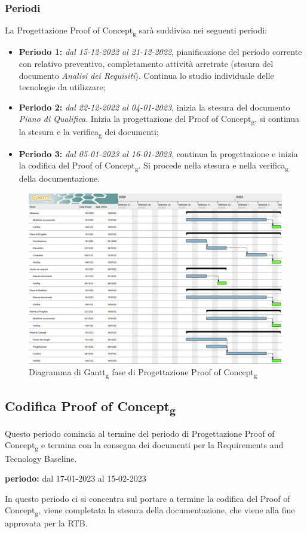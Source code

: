 \subsubsection{Periodi}
La Progettazione Proof of Concept\textsubscript{g} sarà suddivisa nei seguenti periodi:
\begin{itemize}
\item \textbf{Periodo 1:} \textit{dal 15-12-2022 al 21-12-2022}, pianificazione del periodo corrente con relativo preventivo, completamento attività arretrate 
(stesura del documento \textit{Analisi dei Requisiti}). Continua lo studio individuale delle tecnologie da utilizzare;
\item \textbf{Periodo 2:} \textit{dal 22-12-2022 al 04-01-2023}, inizia la stesura del documento \textit{Piano di Qualifica}. Inizia la progettazione del Proof of Concept\textsubscript{g}, si continua la stesura e la verifica\textsubscript{g} dei documenti;
\item \textbf{Periodo 3:} \textit{dal 05-01-2023 al 16-01-2023}, continua la progettazione e inizia la codifica del Proof of Concept\textsubscript{g}. Si procede nella stesura e nella verifica\textsubscript{g} della documentazione.
\end{itemize}

\begin{figure}[H]
    \centering
    \includegraphics[scale=0.72]{image/gantt_poc.png}
    \caption{Diagramma di Gantt\textsubscript{g} fase di Progettazione Proof of Concept\textsubscript{g}}
\end{figure}
\pagebreak

\subsection{Codifica Proof of Concept\textsubscript{g}}
Questo periodo comincia al termine del periodo di Progettazione Proof of Concept\textsubscript{g} e termina con 
la consegna dei documenti per la Requirements and Tecnology Baseline.\\
\begin{center}
\textbf{periodo:} dal 17-01-2023 al 15-02-2023\\
\end{center}
In questo periodo ci si concentra sul portare a termine la codifica del Proof of Concept\textsubscript{g}, viene completata la stesura della documentazione, che 
viene alla fine approvata per la RTB. 

